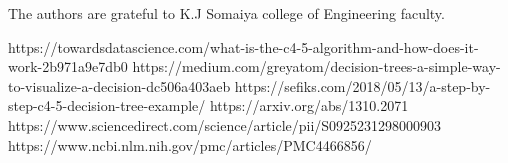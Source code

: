 \documentclass[aps,floatfix,prd,showpacs]{revtex4}
\begin{document}
\acknowledgments
The authors are grateful to K.J Somaiya college of Engineering faculty.

\begin{thebibliography}

https://towardsdatascience.com/what-is-the-c4-5-algorithm-and-how-does-it-work-2b971a9e7db0
https://medium.com/greyatom/decision-trees-a-simple-way-to-visualize-a-decision-dc506a403aeb
https://sefiks.com/2018/05/13/a-step-by-step-c4-5-decision-tree-example/
https://arxiv.org/abs/1310.2071
https://www.sciencedirect.com/science/article/pii/S0925231298000903
https://www.ncbi.nlm.nih.gov/pmc/articles/PMC4466856/



\end{thebibliography}
\end{document}
